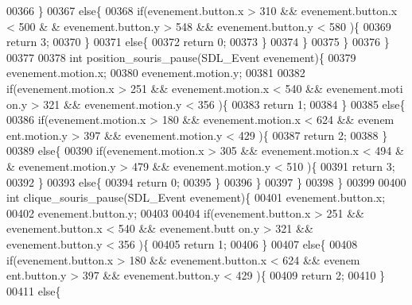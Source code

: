 \begin{DoxyCode}
00366                 \}
00367                 \textcolor{keywordflow}{else}\{
00368                         \textcolor{keywordflow}{if}(evenement.button.x > 310 && evenement.button.x < 500 &
      & evenement.button.y > 548 && evenement.button.y < 580 )\{
00369                                 \textcolor{keywordflow}{return} 3;
00370                         \}
00371                         \textcolor{keywordflow}{else}\{
00372                                 \textcolor{keywordflow}{return} 0;
00373                         \}
00374                 \}
00375         \}
00376 \}
00377 
00378 \textcolor{keywordtype}{int} position\_souris\_pause(SDL\_Event evenement)\{
00379         evenement.motion.x;
00380         evenement.motion.y;
00381 
00382         \textcolor{keywordflow}{if}(evenement.motion.x > 251 && evenement.motion.x < 540 && evenement.moti
      on.y > 321 && evenement.motion.y < 356 )\{
00383                 \textcolor{keywordflow}{return} 1;
00384         \}
00385         \textcolor{keywordflow}{else}\{
00386                 \textcolor{keywordflow}{if}(evenement.motion.x > 180 && evenement.motion.x < 624 && evenem
      ent.motion.y > 397 && evenement.motion.y < 429 )\{
00387                         \textcolor{keywordflow}{return} 2;
00388                 \}
00389                 \textcolor{keywordflow}{else}\{
00390                         \textcolor{keywordflow}{if}(evenement.motion.x > 305 && evenement.motion.x < 494 &
      & evenement.motion.y > 479 && evenement.motion.y < 510 )\{
00391                                 \textcolor{keywordflow}{return} 3;
00392                         \}
00393                         \textcolor{keywordflow}{else}\{
00394                                 \textcolor{keywordflow}{return} 0;
00395                         \}
00396                 \}
00397         \}
00398 \}
00399 
00400 \textcolor{keywordtype}{int} clique\_souris\_pause(SDL\_Event evenement)\{
00401         evenement.button.x;
00402         evenement.button.y;
00403 
00404         \textcolor{keywordflow}{if}(evenement.button.x > 251 && evenement.button.x < 540 && evenement.butt
      on.y > 321 && evenement.button.y < 356 )\{
00405                 \textcolor{keywordflow}{return} 1;
00406         \}
00407         \textcolor{keywordflow}{else}\{
00408                 \textcolor{keywordflow}{if}(evenement.button.x > 180 && evenement.button.x < 624 && evenem
      ent.button.y > 397 && evenement.button.y < 429 )\{
00409                         \textcolor{keywordflow}{return} 2;
00410                 \}
00411                 \textcolor{keywordflow}{else}\{

\end{DoxyCode}

